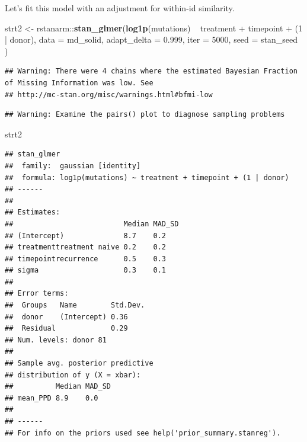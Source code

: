 \documentclass[]{article}
\newenvironment{Shaded}{\begin{snugshade}}{\end{snugshade}}
\newcommand{\KeywordTok}[1]{\textcolor[rgb]{0.13,0.29,0.53}{\textbf{{#1}}}}
\newcommand{\DataTypeTok}[1]{\textcolor[rgb]{0.13,0.29,0.53}{{#1}}}
\newcommand{\DecValTok}[1]{\textcolor[rgb]{0.00,0.00,0.81}{{#1}}}
\newcommand{\FloatTok}[1]{\textcolor[rgb]{0.00,0.00,0.81}{{#1}}}
\newcommand{\StringTok}[1]{\textcolor[rgb]{0.31,0.60,0.02}{{#1}}}
\newcommand{\NormalTok}[1]{{#1}}
\begin{document}
Let's fit this model with an adjustment for within-id similarity.

\begin{Shaded}
\begin{Highlighting}[]
\NormalTok{strt2 <-}\StringTok{ }\NormalTok{rstanarm::}\KeywordTok{stan_glmer}\NormalTok{(}\KeywordTok{log1p}\NormalTok{(mutations) ~}\StringTok{ }\NormalTok{treatment +}\StringTok{ }\NormalTok{timepoint +}\StringTok{ }\NormalTok{(}\DecValTok{1} \NormalTok{|}\StringTok{ }\NormalTok{donor),}
                           \DataTypeTok{data =} \NormalTok{md_solid, }
                           \DataTypeTok{adapt_delta =} \FloatTok{0.999}\NormalTok{,}
                           \DataTypeTok{iter =} \DecValTok{5000}\NormalTok{,}
                           \DataTypeTok{seed =} \NormalTok{stan_seed}
                           \NormalTok{)}
\end{Highlighting}
\end{Shaded}

\begin{verbatim}
## Warning: There were 4 chains where the estimated Bayesian Fraction of Missing Information was low. See
## http://mc-stan.org/misc/warnings.html#bfmi-low
\end{verbatim}

\begin{verbatim}
## Warning: Examine the pairs() plot to diagnose sampling problems
\end{verbatim}

\begin{Shaded}
\begin{Highlighting}[]
\NormalTok{strt2}
\end{Highlighting}
\end{Shaded}

\begin{verbatim}
## stan_glmer
##  family:  gaussian [identity]
##  formula: log1p(mutations) ~ treatment + timepoint + (1 | donor)
## ------
## 
## Estimates:
##                          Median MAD_SD
## (Intercept)              8.7    0.2   
## treatmenttreatment naive 0.2    0.2   
## timepointrecurrence      0.5    0.3   
## sigma                    0.3    0.1   
## 
## Error terms:
##  Groups   Name        Std.Dev.
##  donor    (Intercept) 0.36    
##  Residual             0.29    
## Num. levels: donor 81 
## 
## Sample avg. posterior predictive 
## distribution of y (X = xbar):
##          Median MAD_SD
## mean_PPD 8.9    0.0   
## 
## ------
## For info on the priors used see help('prior_summary.stanreg').
\end{verbatim}
\end{document}
